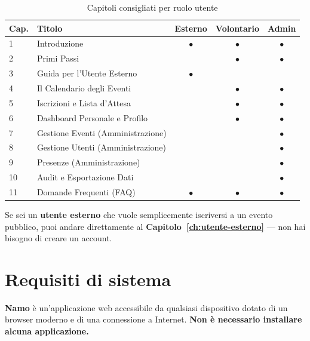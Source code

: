 \documentclass[a4paper,11pt,oneside]{book}
\newcommand{\namo}{\textbf{Namo}}
\begin{document}
\begin{table}[htbp]
\centering
\caption{Capitoli consigliati per ruolo utente}
\label{tab:capitoli-per-ruolo}
\begin{tabularx}{\textwidth}{l X c c c}
\toprule
\textbf{Cap.} & \textbf{Titolo} & \textbf{Esterno} & \textbf{Volontario} & \textbf{Admin} \\
\midrule
1 & Introduzione                        & $\bullet$ & $\bullet$ & $\bullet$ \\
2 & Primi Passi                         &           & $\bullet$ & $\bullet$ \\
3 & Guida per l'Utente Esterno          & $\bullet$ &           &           \\
4 & Il Calendario degli Eventi          &           & $\bullet$ & $\bullet$ \\
5 & Iscrizioni e Lista d'Attesa         &           & $\bullet$ & $\bullet$ \\
6 & Dashboard Personale e Profilo       &           & $\bullet$ & $\bullet$ \\
7 & Gestione Eventi (Amministrazione)   &           &           & $\bullet$ \\
8 & Gestione Utenti (Amministrazione)   &           &           & $\bullet$ \\
9 & Presenze (Amministrazione)          &           &           & $\bullet$ \\
10 & Audit e Esportazione Dati          &           &           & $\bullet$ \\
11 & Domande Frequenti (FAQ)            & $\bullet$ & $\bullet$ & $\bullet$ \\
\bottomrule
\end{tabularx}
\end{table}

\begin{tipbox}
Se sei un \textbf{utente esterno} che vuole semplicemente iscriversi a un evento pubblico, puoi andare direttamente al \textbf{Capitolo~\ref{ch:utente-esterno}} --- non hai bisogno di creare un account.
\end{tipbox}

\section{Requisiti di sistema}
\label{sec:requisiti-sistema}

\namo{} \`e un'applicazione web accessibile da qualsiasi dispositivo dotato di un browser moderno e di una connessione a Internet. \textbf{Non \`e necessario installare alcuna applicazione.}
\end{document}
